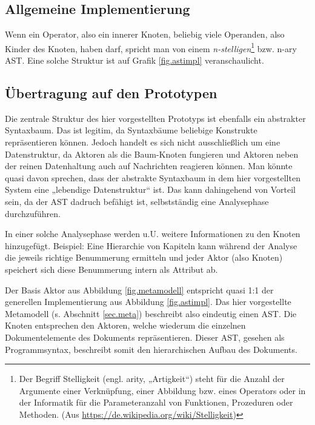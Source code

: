 
\subsection{Allgemeine Implementierung}

Wenn ein Operator, also ein innerer Knoten, beliebig viele Operanden, also Kinder des Knoten,
haben darf, spricht man von einem
\emph{n-stelligen}\footnote{Der Begriff Stelligkeit (engl. arity, „Artigkeit“)
steht für die Anzahl der Argumente einer Verknüpfung, einer Abbildung bzw. eines
Operators oder in der Informatik für die Parameteranzahl von Funktionen,
Prozeduren oder Methoden. (Aus \url{https://de.wikipedia.org/wiki/Stelligkeit})}
bzw. n-ary AST. \citep{edwards}
Eine solche Struktur ist auf Grafik \ref{fig.astimpl} veranschaulicht.


\subsection{Übertragung auf den Prototypen}

Die zentrale Struktur des hier vorgestellten Prototyps ist ebenfalls ein abstrakter Syntaxbaum.
Das ist legitim, da Syntaxbäume beliebige Konstrukte repräsentieren können.
Jedoch handelt es sich nicht ausschließlich um eine Datenstruktur, da Aktoren als die
Baum-Knoten fungieren und Aktoren neben der reinen Datenhaltung auch auf Nachrichten reagieren können.
Man könnte quasi davon sprechen, dass der abstrakte Syntaxbaum in dem hier vorgestellten System
eine „lebendige Datenstruktur“ ist.
Das kann dahingehend von Vorteil sein, da der AST dadruch befähigt ist,
selbstständig eine Analysephase durchzuführen.

In einer solche Analysephase werden u.U. weitere Informationen zu den Knoten hinzugefügt.
Beispiel: Eine Hierarchie von Kapiteln kann während der Analyse die jeweils richtige
Benummerung ermitteln und jeder Aktor (also Knoten) speichert sich diese Benummerung
intern als Attribut ab.

Der Basis Aktor aus Abbildung \ref{fig.metamodell} entspricht quasi 1:1 der
generellen Implementierung aus Abbildung \ref{fig.astimpl}.
Das hier vorgestellte Metamodell (s. Abschnitt \ref{sec.meta}) beschreibt also eindeutig einen AST.
Die Knoten entsprechen den Aktoren, welche wiederum die einzelnen Dokumentelemente
des Dokuments repräsentieren.
Dieser AST, gesehen als Programmsyntax, beschreibt somit den hierarchischen Aufbau des Dokuments.

